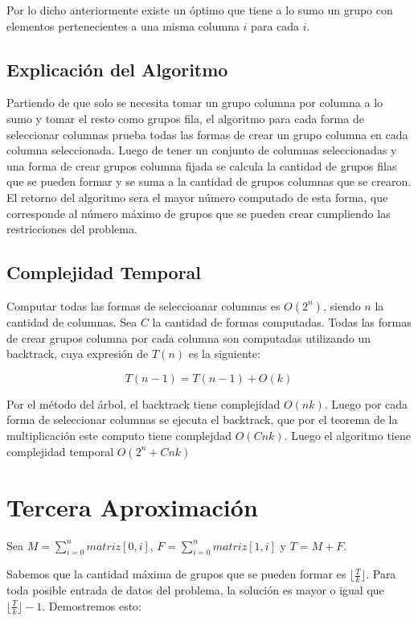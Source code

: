 \documentclass[article]{llncs}
\begin{document}
Por lo dicho anteriormente existe un \'optimo que tiene a lo sumo un grupo con elementos pertenecientes a una misma columna $i$
para cada $i$.

\subsection{Explicaci\'on del Algoritmo}

Partiendo de que solo se necesita tomar un grupo columna por columna a lo sumo y 
tomar el resto como grupos fila, el algoritmo para cada forma de seleccionar 
columnas prueba todas las formas de crear un grupo columna en cada columna seleccionada. 
Luego de tener un conjunto de columnas seleccionadas y una forma de crear grupos columna fijada se 
calcula la cantidad de grupos filas que se pueden formar y se suma a la cantidad de grupos columnas 
que se crearon. El retorno del algoritmo sera el mayor n\'umero computado de esta forma, que corresponde
al n\'umero máximo de grupos que se pueden crear cumpliendo las restricciones del problema.

\subsection{Complejidad Temporal}
Computar todas las formas de seleccioanar columnas es $O(2^n)$, siendo $n$ la cantidad de columnas. 
Sea $C$ la cantidad de formas computadas. Todas las formas de crear grupos columna por cada columna son 
computadas utilizando un backtrack, cuya expresi\'on de $T(n)$ es la siguiente:

$$T(n-1) = T(n-1) + O(k)$$

Por el m\'etodo del \'arbol, el backtrack tiene complejidad $O(nk)$. Luego por cada forma de seleccionar columnas se 
ejecuta el backtrack, que por el teorema de la multiplicación este computo tiene complejdad $O(Cnk)$. Luego el algoritmo 
tiene complejidad temporal $O(2^n + Cnk)$ 


\section{Tercera Aproximaci\'on}

Sea $M = \sum_{i=0}^{n}matriz[0, i]$, $F = \sum_{i=0}^{n}matriz[1, i]$ y 
$T = M + F$.

Sabemos que la cantidad máxima de grupos que se pueden formar es $\lfloor \frac{T}{k} \rfloor$.
Para toda posible entrada de datos del problema, la solución es mayor o igual que 
$\lfloor \frac{T}{k} \rfloor - 1$. Demostremos esto: 
\end{document}
